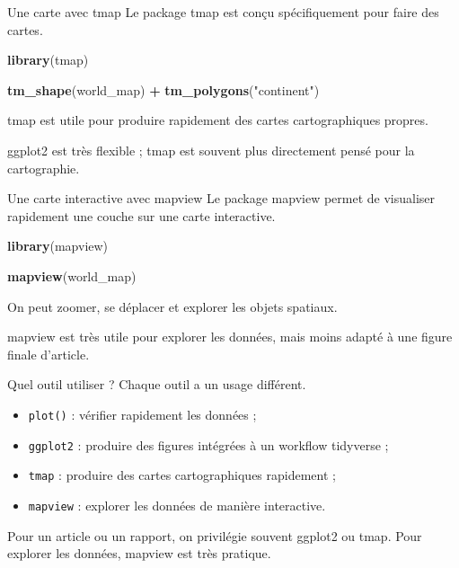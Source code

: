 \documentclass[
  10pt,
  ignorenonframetext,
]{beamer}
\newenvironment{Shaded}{\begin{snugshade}}{\end{snugshade}}
\newcommand{\FunctionTok}[1]{\textcolor[rgb]{0.13,0.29,0.53}{\textbf{#1}}}
\newcommand{\NormalTok}[1]{#1}
\newcommand{\SpecialCharTok}[1]{\textcolor[rgb]{0.81,0.36,0.00}{\textbf{#1}}}
\newcommand{\StringTok}[1]{\textcolor[rgb]{0.31,0.60,0.02}{#1}}
\begin{document}
\begin{frame}[fragile]{Une carte avec tmap}
\label{une-carte-avec-tmap}
Le package tmap est conçu spécifiquement pour faire des cartes.

\begin{Shaded}
\begin{Highlighting}[]
\FunctionTok{library}\NormalTok{(tmap)}

\FunctionTok{tm\_shape}\NormalTok{(world\_map) }\SpecialCharTok{+}
  \FunctionTok{tm\_polygons}\NormalTok{(}\StringTok{"continent"}\NormalTok{)}
\end{Highlighting}
\end{Shaded}

tmap est utile pour produire rapidement des cartes cartographiques
propres.

ggplot2 est très flexible ; tmap est souvent plus directement pensé pour
la cartographie.
\end{frame}

\begin{frame}[fragile]{Une carte interactive avec mapview}
\label{une-carte-interactive-avec-mapview}
Le package mapview permet de visualiser rapidement une couche sur une
carte interactive.

\begin{Shaded}
\begin{Highlighting}[]
\FunctionTok{library}\NormalTok{(mapview)}

\FunctionTok{mapview}\NormalTok{(world\_map)}
\end{Highlighting}
\end{Shaded}

On peut zoomer, se déplacer et explorer les objets spatiaux.

mapview est très utile pour explorer les données, mais moins adapté à
une figure finale d'article.
\end{frame}

\begin{frame}{Quel outil utiliser ?}
\label{quel-outil-utiliser}
Chaque outil a un usage différent.

\begin{itemize}
  \item \texttt{plot()} : vérifier rapidement les données ;
  \item \texttt{ggplot2} : produire des figures intégrées à un workflow tidyverse ;
  \item \texttt{tmap} : produire des cartes cartographiques rapidement ;
  \item \texttt{mapview} : explorer les données de manière interactive.
\end{itemize}

Pour un article ou un rapport, on privilégie souvent ggplot2 ou tmap.
Pour explorer les données, mapview est très pratique.
\end{frame}
\end{document}
